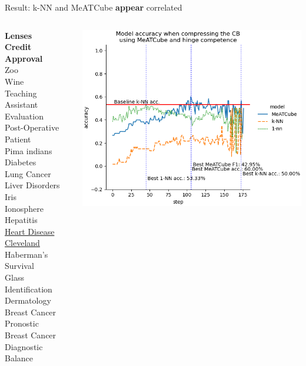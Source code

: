 \documentclass[]{beamer}
\begin{document}
\begin{frame}{Result: k-NN and MeATCube \textbf{appear} correlated}
    \begin{columns}
        \begin{column}{.35\textwidth}
            {\smaller\smaller
            \textbf{Lenses} \\
            \textbf{Credit Approval} \\
            Zoo \\
            Wine \\
            Teaching Assistant Evaluation \\
            Post-Operative Patient \\
            Pima indians Diabetes \\
            Lung Cancer \\
            Liver Disorders \\
            Iris \\
            Ionosphere \\
            Hepatitis \\
            \underline{Heart Disease Cleveland} \\
            Haberman's Survival \\
            Glass Identification \\
            Dermatology \\
            Breast Cancer Pronostic \\
            Breast Cancer Diagnostic \\
            Balance\\
            ~}
        \end{column}
        \begin{column}{.65\textwidth}
            \includegraphics[width=.8\textwidth]{../results/figs/heart+disease.png}

\end{column}
\end{columns}
\end{frame}
\end{document}
